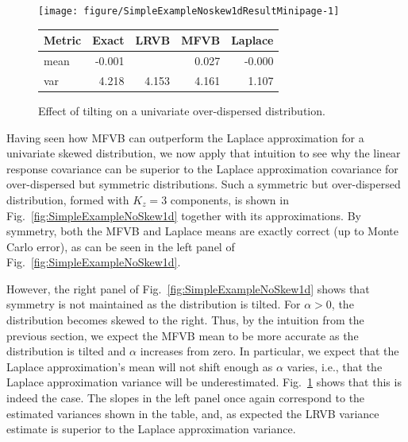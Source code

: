 \documentclass{article}\usepackage[]{graphicx}\usepackage[]{color}
\newenvironment{knitrout}{}{}
\theoremstyle{definition}
\theoremstyle{plain}
\theoremstyle{plain}
\theoremstyle{plain}
\theoremstyle{definition}
\theoremstyle{plain}
\theoremstyle{plain}
\newcommand{\fig}[1]{Fig.~\ref{fig:#1}}
\begin{document}
\begin{figure}
\noindent\begin{minipage}[b]{1\columnwidth}
\begin{minipage}[c][1\totalheight][b]{0.49\columnwidth}\begin{knitrout}
\color{fgcolor}

{\centering \texttt{[image: figure/SimpleExampleNoskew1dResultMinipage-1]} 

}



\end{knitrout}
\end{minipage}
\begin{minipage}[b]{0.49\columnwidth}\begin{center}\begin{tabular}{lrrrr}
  \hline
Metric & Exact & LRVB & MFVB & Laplace \\ 
  \hline
mean & -0.001 &  & 0.027 & -0.000 \\ 
  var & 4.218 & 4.153 & 4.161 & 1.107 \\ 
   \hline
\end{tabular}
\end{center}
\end{minipage}

\end{minipage}
\caption{Effect of tilting on a univariate over-dispersed distribution. \label{fig:SimpleExampleNoSkew1dResult}}
\end{figure}


Having seen how MFVB can outperform the Laplace approximation for a univariate
skewed distribution, we now apply that intuition to see why the linear response
covariance can be superior to the Laplace approximation covariance for
over-dispersed but symmetric distributions. Such a symmetric but over-dispersed
distribution, formed with $K_{z}=3$ components, is shown in
\fig{SimpleExampleNoSkew1d} together with its approximations. By symmetry, both
the MFVB and Laplace means are exactly correct (up to Monte Carlo error), as can
be seen in the left panel of \fig{SimpleExampleNoSkew1d}.

However, the right panel of \fig{SimpleExampleNoSkew1d} shows that
symmetry is not maintained as the distribution is tilted. For $\alpha>0$,
the distribution becomes skewed to the right. Thus, by the intuition
from the previous section, we expect the MFVB mean to be more accurate
as the distribution is tilted and $\alpha$ increases from zero. In
particular, we expect that the Laplace approximation's mean will not
shift enough as $\alpha$ varies, i.e., that the Laplace approximation
variance will be underestimated. \fig{SimpleExampleNoSkew1dResult}
shows that this is indeed the case. The slopes in the left panel once
again correspond to the estimated variances shown in the table, and,
as expected the LRVB variance estimate is superior to the Laplace
approximation variance.
\end{document}
